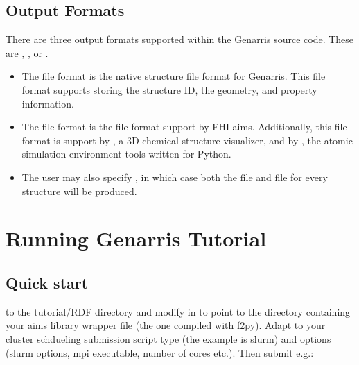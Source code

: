 \documentclass[letterpaper,10pt,english]{sphinxmanual}
\begin{document}
\section{Output Formats}
\label{\detokenize{index:output-formats}}
There are three output formats supported within the Genarris source code. These
are , , or .
\begin{itemize}
\item {} 
The  file format is the native structure file format for Genarris.
This file format supports storing the structure ID, the geometry, and
property information.

\item {} 
The  file format is the file format support by FHI-aims. Additionally,
this file format is support by  , a 3D chemical structure visualizer,
and by , the atomic simulation environment tools written for Python.

\item {} 
The user may also specify , in which case both the  file
and  file for every structure will be produced.

\end{itemize}


\chapter{Running Genarris Tutorial}
\label{\detokenize{index:running-genarris-tutorial}}

\section{Quick start}
\label{\detokenize{index:quick-start}}
 to the tutorial/RDF directory and modify  in 
to point to the directory containing your aims library wrapper file (the one compiled
with f2py). Adapt  to your cluster schdueling submission script
type (the example is slurm) and options (slurm options, mpi executable, number
of cores etc.). Then submit e.g.:

\begin{sphinxVerbatim}[commandchars=\\\{\}]
 
\end{sphinxVerbatim}
\end{document}

